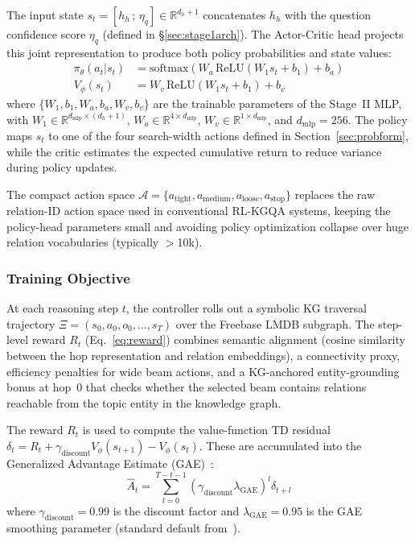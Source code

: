 \documentclass[10pt,conference]{IEEEtran}
\begin{document}
The input state $s_t = [h_h \,;\, \eta_q] \in \mathbb{R}^{d_h+1}$ concatenates $h_h$ with the question confidence score $\eta_q$ (defined in §\ref{sec:stage1arch}). The Actor-Critic head projects this joint representation to produce both policy probabilities and state values:
\begin{align}
\pi_\theta(a_t|s_t) &= \text{softmax}(W_a \, \text{ReLU}(W_1 s_t + b_1) + b_a) \\
V_\phi(s_t) &= W_v \, \text{ReLU}(W_1 s_t + b_1) + b_v
\end{align}
where $\{W_1, b_1, W_a, b_a, W_v, b_v\}$ are the trainable parameters of the Stage~II MLP, with $W_1 \in \mathbb{R}^{d_{\text{mlp}} \times (d_h+1)}$, $W_a \in \mathbb{R}^{4 \times d_{\text{mlp}}}$, $W_v \in \mathbb{R}^{1 \times d_{\text{mlp}}}$, and $d_{\text{mlp}}=256$. The policy maps $s_t$ to one of the four search-width actions defined in Section~\ref{sec:probform}, while the critic estimates the expected cumulative return to reduce variance during policy updates.

The compact action space $\mathcal{A} = \{a_{\text{tight}}, a_{\text{medium}}, a_{\text{loose}}, a_{\text{stop}}\}$ replaces the raw relation-ID action space used in conventional RL-KGQA systems, keeping the policy-head parameters small and avoiding policy optimization collapse over huge relation vocabularies (typically $>$10k).

\subsubsection{Training Objective}
\label{sec:stage2_training}

At each reasoning step $t$, the controller rolls out a symbolic KG traversal trajectory $\Xi = (s_0, a_0, o_0, \dots, s_T)$ over the Freebase LMDB subgraph. The step-level reward $R_t$ (Eq.~\ref{eq:reward}) combines semantic alignment (cosine similarity between the hop representation and relation embeddings), a connectivity proxy, efficiency penalties for wide beam actions, and a KG-anchored entity-grounding bonus at hop~0 that checks whether the selected beam contains relations reachable from the topic entity in the knowledge graph.

The reward $R_t$ is used to compute the value-function TD residual $\delta_t = R_t + \gamma_{\text{discount}} V_\phi(s_{t+1}) - V_\phi(s_t)$. These are accumulated into the Generalized Advantage Estimate (GAE)~\cite{schulman2016gae}:
\begin{equation}
\hat{A}_t = \sum_{l=0}^{T-t-1} (\gamma_{\text{discount}} \lambda_{\text{GAE}})^l \delta_{t+l}
\end{equation}
where $\gamma_{\text{discount}}=0.99$ is the discount factor and $\lambda_{\text{GAE}}=0.95$ is the GAE smoothing parameter (standard default from~\cite{schulman2016gae}).
\end{document}

